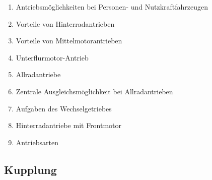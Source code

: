 \begin{enumerate}
\item
  Antriebsmöglichkeiten bei Personen- und Nutzkraftfahrzeugen\\
\item
  Vorteile von Hinterradantrieben\\
\item
  Vorteile von Mittelmotorantrieben\\
\item
  Unterflurmotor-Antrieb\\
\item
  Allradantriebe\\
\item
  Zentrale Ausgleichsmöglichkeit bei Allradantrieben\\
\item
  Aufgaben des Wechselgetriebes\\
\item
  Hinterradantriebe mit Frontmotor\\
\item
  Antriebsarten
\end{enumerate}

\subsection{Kupplung}\label{kupplung}


